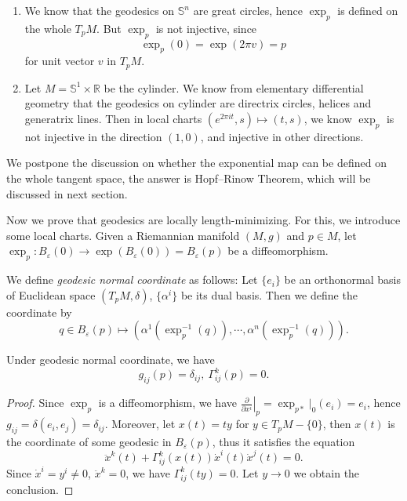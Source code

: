 \begin{eg}
    \begin{enumerate}[(1)]
        \item We know that the geodesics on $\mathbb{S}^n$ are great circles, hence $\exp_p$ is defined on the whole $T_pM$.
        But $\exp_p$ is not injective, since 
        \[\exp_p(0)=\exp(2\pi v)=p\]
        for unit vector $v$ in $T_pM$.
        \item Let $M=\mathbb{S}^1\times\mathbb{R}$ be the cylinder.
        We know from elementary differential geometry that the geodesics on cylinder are directrix circles, helices and generatrix lines.
        Then in local charts $(e^{2\pi it},s)\mapsto(t,s)$, we know $\exp_p$ is not injective in the direction $(1,0)$, and injective in other directions.
    \end{enumerate}
\end{eg}

We postpone the discussion on whether the exponential map can be defined on the whole tangent space, the answer is Hopf--Rinow Theorem, which will be discussed in next section.

Now we prove that geodesics are locally length-minimizing.
For this, we introduce some local charts.
Given a Riemannian manifold $(M,g)$ and $p\in M$, let $\exp_p:B_\varepsilon(0)\to\exp(B_\varepsilon(0))=B_\varepsilon(p)$ be a diffeomorphism.

\begin{defn}
    We define \emph{geodesic normal coordinate} as follows:
    Let $\{e_i\}$ be an orthonormal basis of Euclidean space $(T_pM,\delta)$, $\{\alpha^i\}$ be its dual basis.
    Then we define the coordinate by
    \[q\in B_\varepsilon(p)\mapsto(\alpha^1(\exp_p^{-1}(q)),\cdots,\alpha^n(\exp_p^{-1}(q))).\]
\end{defn}

\begin{prop}
    Under geodesic normal coordinate, we have
    \[g_{ij}(p)=\delta_{ij},\ \Gamma^k_{ij}(p)=0.\]
\end{prop}
\begin{proof}
    Since $\exp_p$ is a diffeomorphism, we have $\left.\frac{\partial{}}{\partial{x^i}}\right|_p=\exp_{p*}|_0(e_i)=e_i$, hence $g_{ij}=\delta(e_i,e_j)=\delta_{ij}$.
    Moreover, let $x(t)=ty$ for $y\in T_pM-\{0\}$, then $x(t)$ is the coordinate of some geodesic in $B_\varepsilon(p)$, thus it satisfies the equation
    \[\ddot{x}^k(t)+\Gamma^k_{ij}(x(t))\dot{x}^i(t)\dot{x}^j(t)=0.\]
    Since $\dot{x}^i=y^i\neq 0$, $\ddot{x}^k=0$, we have $\Gamma^k_{ij}(ty)=0$.
    Let $y\to 0$ we obtain the conclusion.
\end{proof}

